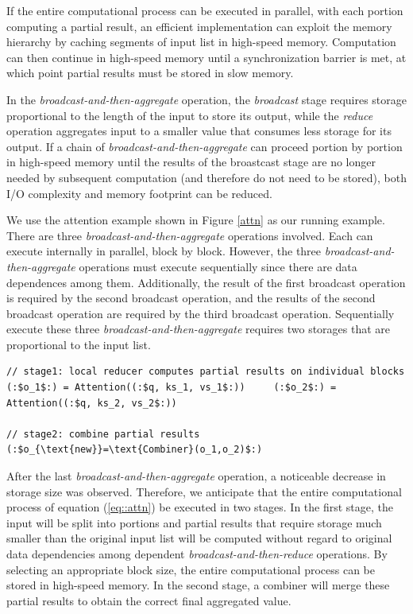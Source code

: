 If the entire computational process can be executed in parallel, with each portion computing a partial result,
an efficient implementation can exploit the memory hierarchy by caching segments of input list in high-speed memory.
Computation can then continue in high-speed memory until a synchronization barrier is met, at which point partial results must be stored in slow memory.

In the \textit{broadcast-and-then-aggregate} operation, the \textit{broadcast} stage requires storage proportional to the length of the input to store its output,
while the \textit{reduce} operation aggregates input to a smaller value that consumes less storage for its output.
If a chain of \textit{broadcast-and-then-aggregate} can proceed portion by portion in high-speed memory until the results of the broastcast stage are no longer needed by subsequent computation (and therefore do not need to be stored),
both I/O complexity and memory footprint can be reduced.

We use the attention example shown in Figure \ref{attn} as our running example. 
There are three \textit{broadcast-and-then-aggregate} operations involved.
Each can execute internally in parallel, block by block.
However, the three \textit{broadcast-and-then-aggregate} operations must execute sequentially since there are data dependences among them.
Additionally, the result of the first broadcast operation is required by the second broadcast operation, and the results of the second broadcast operation are required by the third broadcast operation.
Sequentially execute these three \textit{broadcast-and-then-aggregate} requires two storages that are proportional to the input list.

\begin{lstlisting}[language=code_example2, caption={}]
// stage1: local reducer computes partial results on individual blocks
(:$o_1$:) = Attention((:$q, ks_1, vs_1$:))     (:$o_2$:) = Attention((:$q, ks_2, vs_2$:))

// stage2: combine partial results
(:$o_{\text{new}}=\text{Combiner}(o_1,o_2)$:)
\end{lstlisting}

After the last \textit{broadcast-and-then-aggregate} operation, a noticeable decrease in storage size was observed.
Therefore, we anticipate that the entire computational process of equation (\ref{eq::attn}) be executed in two stages.
In the first stage, the input will be split into portions and partial results that require storage much smaller than the original input list will be computed without regard to original data dependencies among dependent \textit{broadcast-and-then-reduce} operations.
By selecting an appropriate block size, the entire computational process can be stored in high-speed memory.
In the second stage, a combiner will merge these partial results to obtain the correct final aggregated value.

